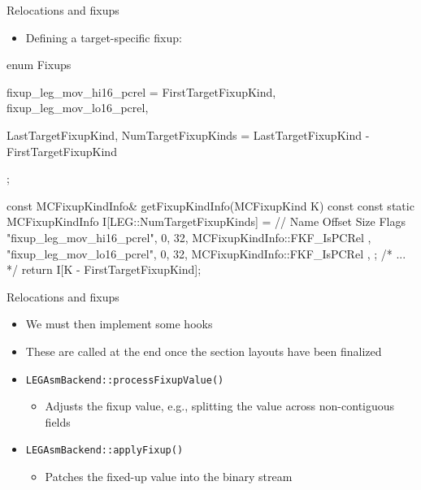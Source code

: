 
\begin{frame}[fragile]{Relocations and fixups}

\begin{itemize}
    \item Defining a target-specific fixup:
\end{itemize}

\begin{codebox}
enum Fixups {
  fixup_leg_mov_hi16_pcrel = FirstTargetFixupKind,
  fixup_leg_mov_lo16_pcrel,
  
  LastTargetFixupKind,
  NumTargetFixupKinds = LastTargetFixupKind - FirstTargetFixupKind
};
\end{codebox}

\begin{codebox}
const MCFixupKindInfo& getFixupKindInfo(MCFixupKind K) const {
  const static MCFixupKindInfo I[LEG::NumTargetFixupKinds] = {
    // Name          Offset Size Flags
    { "fixup_leg_mov_hi16_pcrel", 0,  32, MCFixupKindInfo::FKF_IsPCRel },
    { "fixup_leg_mov_lo16_pcrel", 0,  32, MCFixupKindInfo::FKF_IsPCRel },
  };
  /* ... */
  return I[K - FirstTargetFixupKind];
}
\end{codebox}

\end{frame}


\begin{frame}{Relocations and fixups}

\begin{itemize}
    \item We must then implement some hooks
    \item These are called at the end once the section layouts have been finalized
    \item \texttt{LEGAsmBackend::processFixupValue()}
    \begin{itemize}
        \item Adjusts the fixup value, e.g., splitting the value across non-contiguous fields
    \end{itemize}
    \item \texttt{LEGAsmBackend::applyFixup()}
    \begin{itemize}
        \item Patches the fixed-up value into the binary stream
    \end{itemize}
\end{itemize}

\end{frame}

